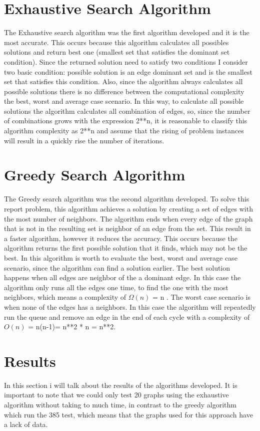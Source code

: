 \documentclass[...]{revdetua}
\begin{document}
\section{Exhaustive Search Algorithm}

The Exhaustive search algorithm was the first algorithm developed and it is the most accurate. This occurs because this algorithm calculates all possibles solutions and return best one (smallest set that satisfies the dominant set condition). Since the returned solution need to satisfy two conditions I consider two basic condition: possible solution is an edge dominant set and is the smallest set that satisfies this condition. Also, since the algorithm always calculates all possible solutions there is no difference between the computational complexity the best, worst and average case scenario. In this way, to calculate all possible solutions the algorithm calculates all combination of edges, so, since the number of combinations grows with the expression 2**n, it is reasonable to classify this algorithm complexity as 2**n and assume that the rising of problem instances will result in a quickly rise the number of iterations.

\section{Greedy Search Algorithm}
The Greedy search algorithm was the second algorithm developed. To solve this report problem, this algorithm achieves a solution by creating a set of edges with the most number of neighbors. The algorithm ends when every edge of the graph that is not in the resulting set is neighbor of an edge from the set. This result in a faster algorithm, however it reduces the accuracy. This occurs because the algorithm returns the first possible solution that it finds, which may not be the best.  
In this algorithm is worth to evaluate the best, worst and average case scenario, since the algorithm can find a solution earlier. The best solution happens when all edges are neighbor of the a dominant edge. In this case the algorithm only runs all the edges one time, to find the one with the most neighbors, which means a complexity of $\Omega(n)$ = n . The worst case scenario is when none of the edges has a neighbors. In this case the algorithm will repeatedly run the queue and remove an edge in the end of each cycle with a complexity of  $O(n)$ = n(n-1)= n**2 * n = n**2. 

\section{Results}
In this section i will talk about the results of the algorithms developed. It is important to note that we could only test 20 graphs using the exhaustive algorithm without taking to much time, in contrast to the greedy algorithm which run the 385 test, which means that the graphs used for this approach have a lack of data.
\end{document}
